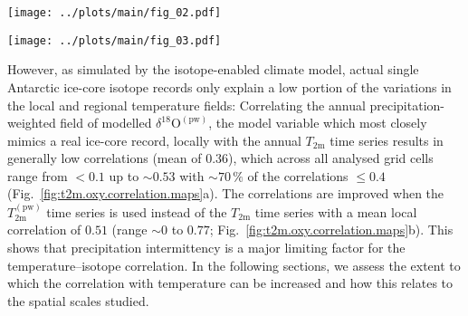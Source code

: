 \documentclass[cp, manuscript]{copernicus}
\begin{document}
\begin{figure*}[t]%
\centering
\texttt{[image: ../plots/main/fig\_02.pdf]}
\caption{%
  Temperature decorrelation lengths across Antarctica. The temperature
  decorrelation lengths ($\tau$, in km) for each Antarctic model grid cell were
  estimated by fitting an exponential model to the correlation--distance
  relationship (cf.\ Eq.~\ref{eq:t2m.decorr}) obtained from correlating the
  local annual near-surface $T_{2\mathrm{m}}$ time series with the respective
  temperature time series from all other grid cells. Note that only the
  continental grid cells were used for the fit. Although the decorrelation
  lengths show a strong partition between East and West Antarctica, they
  are larger than $1000$\,km at most locations.}
\label{fig:t2m.decorrelation.map}%
\end{figure*}%

\begin{figure*}[t]%
\centering
\texttt{[image: ../plots/main/fig\_03.pdf]}
\caption{%
  The local temperature--isotope relationship across Antarctica. Shown are the
  local correlations for each model grid cell between the annual time series of
  precipitation-weighted oxygen isotope composition and of \textbf{(a)}
  near-surface temperature and \textbf{(b)} precipitation-weighted near-surface
  temperature. The difference between the maps clearly demonstrates that
  precipitation intermittency is a major limiting factor for the
  temperature--isotope relationship.}
\label{fig:t2m.oxy.correlation.maps}%
\end{figure*}%

However, as simulated by the isotope-enabled climate model, actual single
Antarctic ice-core isotope records only explain a low portion of the variations
in the local and regional temperature fields: Correlating the annual
precipitation-weighted field of modelled
$\delta^{18}\mathrm{O}^{\mathrm{(pw)}}$, the model variable which most closely
mimics a real ice-core record, locally with the annual $T_{2\mathrm{m}}$ time
series results in generally low correlations (mean of $0.36$), which across all
analysed grid cells range from $<0.1$ up to $\sim0.53$ with $\sim70\,\%$ of the
correlations $\leq0.4$ (Fig.~\ref{fig:t2m.oxy.correlation.maps}a). The
correlations are improved when the $T_{2\mathrm{m}}^{\mathrm{(pw)}}$ time series
is used instead of the $T_{2\mathrm{m}}$ time series with a mean local
correlation of $0.51$ (range $\sim0$ to $0.77$;
Fig.~\ref{fig:t2m.oxy.correlation.maps}b). This shows that precipitation
intermittency is a major limiting factor for the temperature--isotope
correlation. In the following sections, we assess the extent to which the
correlation with temperature can be increased and how this relates to the
spatial scales studied.
\end{document}
